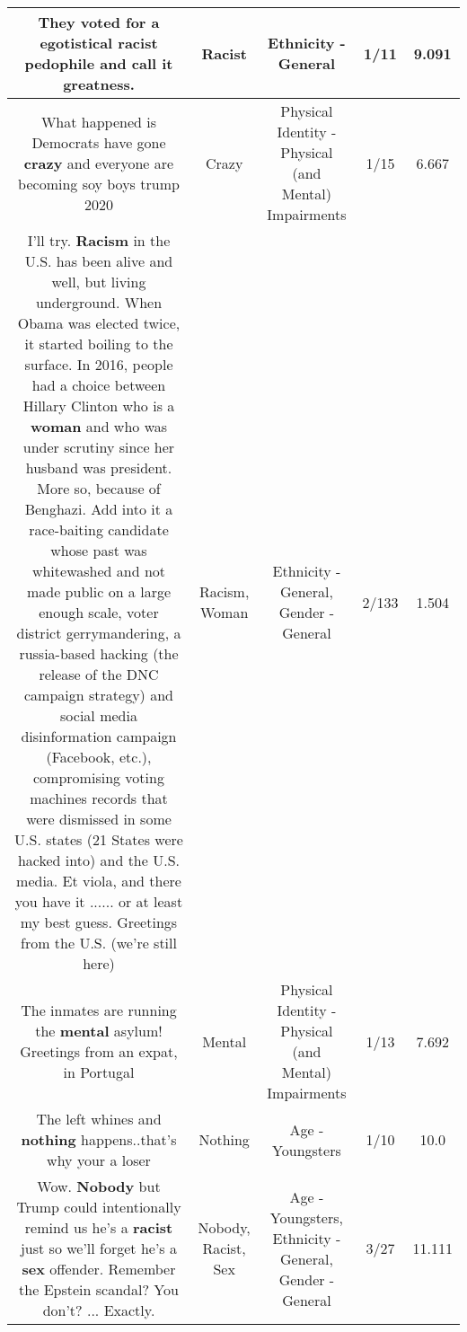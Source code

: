 \documentclass[11pt]{article}
\newlength\mylength
\begin{document}
\begin{center}
\begin{longtable}{|C{.65\mylength}|C{.30\mylength}|C{.12\mylength}|C{.12\mylength}|C{.12\mylength}|}
  \small They voted for a egotistical \textbf{racist} pedophile and call it greatness.\normalsize   & Racist & Ethnicity - General & 1/11 & 9.091 \\  \hline
  \small What happened is Democrats have gone \textbf{crazy} and everyone are becoming soy boys trump 2020\normalsize   & Crazy & Physical Identity - Physical (and Mental) Impairments & 1/15 & 6.667 \\  \hline
  \small I'll try. \textbf{Racism} in the U.S. has been alive and well, but living underground. When Obama was elected twice, it started boiling to the surface. In 2016, people had a choice between Hillary Clinton who is a \textbf{woman} and who was under scrutiny since her husband was president. More so, because of Benghazi. Add into it a race-baiting candidate whose past was whitewashed and not made public on a large enough scale, voter district gerrymandering, a russia-based hacking (the release of the DNC campaign strategy) and social media disinformation campaign (Facebook, etc.), compromising voting machines records that were dismissed in some U.S. states (21 States were hacked into) and the U.S. media. Et viola, and there you have it ...... or at least my best guess. Greetings from the U.S. (we're still here)\normalsize   & Racism, Woman & Ethnicity - General, Gender - General & 2/133 & 1.504 \\  \hline
  \small The inmates are running the \textbf{mental} asylum! Greetings from an expat, in Portugal\normalsize   & Mental & Physical Identity - Physical (and Mental) Impairments & 1/13 & 7.692 \\  \hline
  \small The left whines and \textbf{nothing} happens..that's why your a loser\normalsize   & Nothing & Age - Youngsters & 1/10 & 10.0 \\  \hline
  \small Wow. \textbf{Nobody} but Trump could intentionally remind us he's a \textbf{racist} just so we'll forget he's a \textbf{sex} offender. Remember the Epstein scandal? You don't?
... Exactly.\normalsize   & Nobody, Racist, Sex & Age - Youngsters, Ethnicity - General, Gender - General & 3/27 & 11.111 \\  \hline

\end{longtable}
\end{center}
\end{document}
